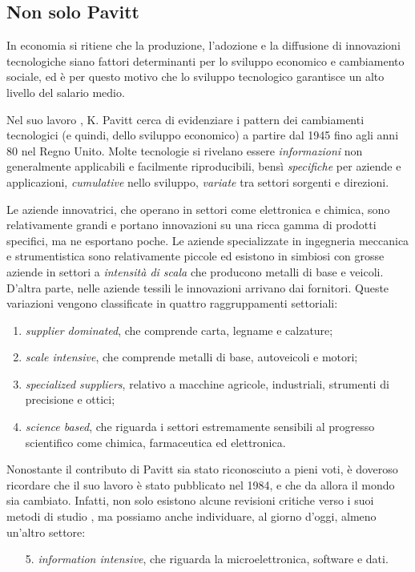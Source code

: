 \documentclass[]{article}
\begin{document}
	\begin{multicols}{2}
	\tableofcontents
	
	\section{Non solo Pavitt}
	In economia si ritiene che la produzione, l'adozione e la diffusione di innovazioni tecnologiche siano fattori determinanti per lo sviluppo economico e cambiamento sociale, ed è per questo motivo che lo sviluppo tecnologico garantisce un alto livello del salario medio.
	
	Nel suo lavoro \cite{pavitt}, K. Pavitt cerca di evidenziare i pattern dei cambiamenti tecnologici (e quindi, dello sviluppo economico) a partire dal 1945 fino agli anni 80 nel Regno Unito. Molte tecnologie si rivelano essere \textit{informazioni} non generalmente applicabili e facilmente riproducibili, bensì \textit{specifiche} per aziende e applicazioni, \textit{cumulative} nello sviluppo, \textit{variate} tra settori sorgenti e direzioni. 
	
	Le aziende innovatrici, che operano in settori come elettronica e chimica, sono relativamente grandi e portano innovazioni su una ricca gamma di prodotti specifici, ma ne esportano poche. Le aziende specializzate in ingegneria meccanica e strumentistica sono relativamente piccole ed esistono in simbiosi con grosse aziende in settori a \textit{intensità di scala} che producono metalli di base e veicoli. D'altra parte, nelle aziende tessili le innovazioni arrivano dai fornitori. Queste variazioni vengono classificate in quattro raggruppamenti settoriali:
	\begin{enumerate}
		\item \textit{supplier dominated}, che comprende carta, legname e calzature;
		\item \textit{scale intensive}, che comprende metalli di base, autoveicoli e motori;
		\item \textit{specialized suppliers}, relativo a macchine agricole, industriali, strumenti di precisione e ottici;
		\item \textit{science based}, che riguarda i settori estremamente sensibili al progresso scientifico come chimica, farmaceutica ed elettronica.
	\end{enumerate}
	
	Nonostante il  contributo di Pavitt sia stato riconosciuto a pieni voti, è doveroso ricordare che il suo lavoro è stato pubblicato nel 1984, e che da allora il mondo sia cambiato. Infatti, non solo esistono alcune revisioni critiche verso i suoi metodi di studio \cite{archibugi}, ma possiamo anche individuare, al giorno d'oggi, almeno un'altro settore:
	\begin{enumerate}
		\item[5.] \textit{information intensive}, che riguarda la microelettronica, software e dati.
	\end{enumerate}


\end{multicols}
\end{document}
